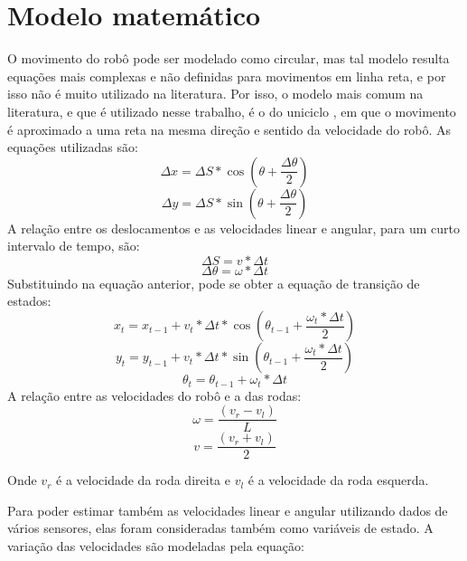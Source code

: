 \documentclass[
	12pt,				%
	openright,			%
	twoside,			%
	convert,
	a4paper,			%
	english,			%
	french,				%
	spanish,			%
	brazil				%
	]{abntex2}
\begin{document}
\section{Modelo matemático}
O movimento do robô pode ser modelado como circular, mas tal modelo resulta equações mais complexas e não definidas para movimentos em linha reta, e por isso não é muito utilizado na literatura. Por isso, o modelo mais comum na literatura, e que é utilizado nesse trabalho, é o do uniciclo \cite{siegwart2004introduction}, em que o movimento é aproximado a uma reta na mesma direção e sentido da velocidade do robô. As equações utilizadas são:
\begin{equation}
	\Delta x = \Delta S * \cos(\theta + \frac{\Delta\theta}{2})
\end{equation}
\begin{equation}
	\Delta y = \Delta S * \sin(\theta + \frac{\Delta\theta}{2})
\end{equation}
A relação entre os deslocamentos e as velocidades linear e angular, para um curto intervalo de tempo, são:
\begin{equation}
	 \Delta S = v * \Delta t
\end{equation}
\begin{equation}
	 \Delta \theta = \omega * \Delta t
\end{equation}
Substituindo na equação anterior, pode se obter a equação de transição de estados:
\begin{equation}
	x_t = x_{t-1} + v_t * \Delta t * \cos(\theta_{t-1} + \frac{\omega_{t} * \Delta t}{2})
\end{equation}
\begin{equation}
	y_t = y_{t-1} + v_t * \Delta t * \sin(\theta_{t-1} + \frac{\omega_{t} * \Delta t}{2})
\end{equation}
\begin{equation}
	\theta_t = \theta_{t-1} + \omega_{t} * \Delta t
\end{equation}
A relação entre as velocidades do robô e a das rodas:
\begin{equation}
	\omega = \frac{(v_r - v_l)}{L}
\end{equation}
\begin{equation}
	 v = \frac{(v_r + v_l)}{2}
\end{equation}
\par
Onde $v_r$ é a velocidade da roda direita e $v_l$ é a velocidade da roda esquerda.
\par
Para poder estimar também as velocidades linear e angular utilizando dados de vários sensores, elas foram consideradas também como variáveis de estado. A variação das velocidades são modeladas pela equação:
\end{document}
